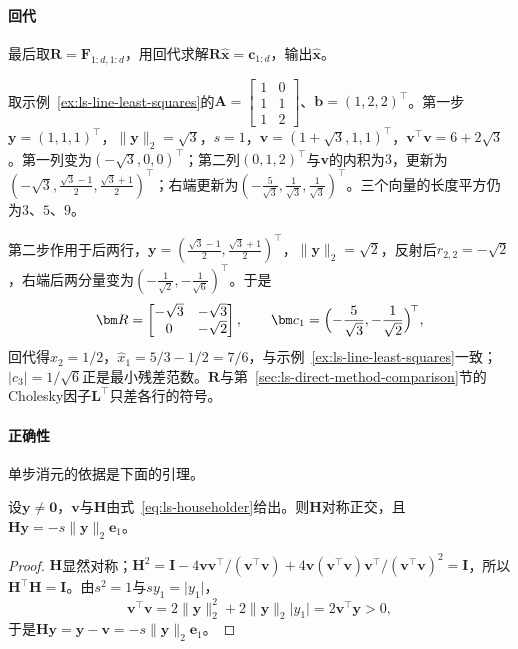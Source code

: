 \paragraph{回代}
最后取$\bm R=\bm F_{1:d,1:d}$，用回代求解$\bm R\hat{\bm x}=\bm c_{1:d}$，输出$\hat{\bm x}$。

\begin{example}[直线拟合的Householder三角化]
\label{ex:ls-householder-line-fit}
取示例~\ref{ex:ls-line-least-squares}的$\bm A=\left[\begin{smallmatrix}1&0\\1&1\\1&2\end{smallmatrix}\right]$、$\bm b=(1,2,2)^\top$。第一步$\bm y=(1,1,1)^\top$，$\lVert\bm y\rVert_2=\sqrt3$，$s=1$，$\bm v=(1+\sqrt3,1,1)^\top$，$\bm v^\top\bm v=6+2\sqrt3$。第一列变为$(-\sqrt3,0,0)^\top$；第二列$(0,1,2)^\top$与$\bm v$的内积为$3$，更新为$(-\sqrt3,\tfrac{\sqrt3-1}2,\tfrac{\sqrt3+1}2)^\top$；右端更新为$(-\tfrac5{\sqrt3},\tfrac1{\sqrt3},\tfrac1{\sqrt3})^\top$。三个向量的长度平方仍为$3$、$5$、$9$。

第二步作用于后两行，$\bm y=(\tfrac{\sqrt3-1}2,\tfrac{\sqrt3+1}2)^\top$，$\lVert\bm y\rVert_2=\sqrt2$，反射后$r_{2,2}=-\sqrt2$，右端后两分量变为$(-\tfrac1{\sqrt2},-\tfrac1{\sqrt6})^\top$。于是
\[
 \bm R=\begin{bmatrix}-\sqrt3&-\sqrt3\\0&-\sqrt2\end{bmatrix},\qquad
 \bm c_1=\Bigl(-\frac5{\sqrt3},-\frac1{\sqrt2}\Bigr)^{\!\top},
\]
回代得$\hat x_2=1/2$，$\hat x_1=5/3-1/2=7/6$，与示例~\ref{ex:ls-line-least-squares}一致；$\lvert c_3\rvert=1/\sqrt6$正是最小残差范数。$\bm R$与第~\ref{sec:ls-direct-method-comparison}节的Cholesky因子$\bm L^\top$只差各行的符号。
\end{example}

\paragraph{正确性}
单步消元的依据是下面的引理。

\begin{lemma}[Householder反射]
\label{lem:ls-householder-reflection}
设$\bm y\neq\bm0$，$\bm v$与$\bm H$由式~\eqref{eq:ls-householder}给出。则$\bm H$对称正交，且$\bm H\bm y=-s\lVert\bm y\rVert_2\bm e_1$。
\end{lemma}
\begin{proof}
$\bm H$显然对称；$\bm H^2=\bm I-4\bm v\bm v^\top/(\bm v^\top\bm v)+4\bm v(\bm v^\top\bm v)\bm v^\top/(\bm v^\top\bm v)^2=\bm I$，所以$\bm H^\top\bm H=\bm I$。由$s^2=1$与$sy_1=\lvert y_1\rvert$，
\[
 \bm v^\top\bm v=2\lVert\bm y\rVert_2^2+2\lVert\bm y\rVert_2\lvert y_1\rvert=2\bm v^\top\bm y>0,
\]
于是$\bm H\bm y=\bm y-\bm v=-s\lVert\bm y\rVert_2\bm e_1$。
\end{proof}

